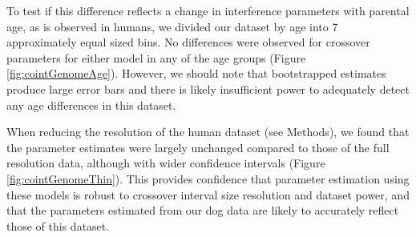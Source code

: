 
To test if this difference reflects a change in interference parameters with parental age, as is observed in humans\cite{Campbell2015},
we divided our dataset by age into 7 approximately equal sized bins.
No differences were observed for crossover parameters for either model in any of the age groups (Figure \ref{fig:cointGenomeAge}).
However, we should note that bootstrapped estimates produce large error bars and there is likely insufficient power to adequately detect any age differences in this dataset.

When reducing the resolution of the human dataset (see Methods), we found that the parameter estimates were largely unchanged compared to those of the full resolution data, although with wider confidence intervals (Figure \ref{fig:cointGenomeThin}).
This provides confidence that parameter estimation using these models is robust to crossover interval size resolution and dataset power,
and that the parameters estimated from our dog data are likely to accurately reflect those of this dataset.


